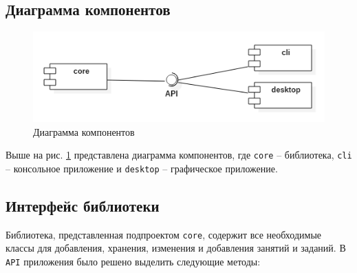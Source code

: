\subsection{Диаграмма компонентов}

\begin{figure}[H]
	\begin{center}
		\includegraphics[scale=0.8]{pics/components}
		\caption{Диаграмма компонентов} 
		\label{pic:component_diagram}
	\end{center}
\end{figure}

Выше на рис. \ref{pic:component_diagram} представлена диаграмма компонентов, где \texttt{core} -- библиотека, \texttt{cli} -- консольное приложение и \texttt{desktop} -- графическое приложение.

\subsection{Интерфейс библиотеки}

Библиотека, представленная подпроектом \texttt{core}, содержит все необходимые классы для добавления, хранения, изменения и добавления занятий и заданий. В \texttt{API} приложения было решено выделить следующие методы:


